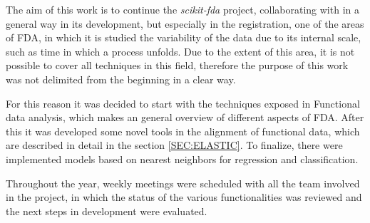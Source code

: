 The aim of this work is to continue the \textit{scikit-fda} project,
collaborating with in a general way in its development, but especially in the
registration, one of the areas of FDA, in which it is studied the
variability of the data due to its internal scale, such as time
in which a process unfolds. Due to the extent of this area, it is not possible
to cover all techniques in this field, therefore the purpose of this work was
not delimited from the beginning in a clear way.

For this reason it was decided to start with the techniques
exposed in Functional data analysis\cite{Ramsay2005}, which makes an general overview of different
aspects of FDA. After this it was developed some
novel tools in the alignment of functional data, which are described in detail in the
section \ref{SEC:ELASTIC}. To finalize, there were implemented models based on
nearest neighbors for regression and classification.

Throughout the year, weekly meetings were scheduled with all the team involved
in the project, in which the status of the various functionalities was reviewed
and the next steps in development were evaluated.

